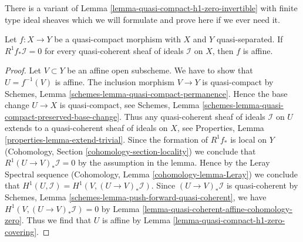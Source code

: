 \noindent
There is a variant of Lemma \ref{lemma-quasi-compact-h1-zero-invertible}
with finite type ideal sheaves which we will formulate and prove here if
we ever need it.

\begin{lemma}
\label{lemma-criterion-affine-morphism}
Let $f : X \to Y$ be a quasi-compact morphism with $X$ and $Y$ quasi-separated.
If $R^1f_*\mathcal{I} = 0$ for every quasi-coherent sheaf of ideals
$\mathcal{I}$ on $X$, then $f$ is affine.
\end{lemma}

\begin{proof}
Let $V \subset Y$ be an affine open subscheme. We have to show that
$U = f^{-1}(V)$ is affine. The inclusion morphism $V \to Y$ is quasi-compact
by Schemes, Lemma \ref{schemes-lemma-quasi-compact-permanence}.
Hence the base change $U \to X$ is quasi-compact, see
Schemes, Lemma \ref{schemes-lemma-quasi-compact-preserved-base-change}.
Thus any quasi-coherent sheaf of ideals $\mathcal{I}$ on $U$
extends to a quasi-coherent sheaf of ideals on $X$, see
Properties, Lemma \ref{properties-lemma-extend-trivial}.
Since the formation of $R^1f_*$ is local on $Y$
(Cohomology, Section \ref{cohomology-section-locality})
we conclude that $R^1(U \to V)_*\mathcal{I} = 0$ by the assumption
in the lemma. Hence by the Leray Spectral sequence
(Cohomology, Lemma \ref{cohomology-lemma-Leray})
we conclude that $H^1(U, \mathcal{I}) = H^1(V, (U \to V)_*\mathcal{I})$.
Since $(U \to V)_*\mathcal{I}$ is quasi-coherent by
Schemes, Lemma \ref{schemes-lemma-push-forward-quasi-coherent}, we have
$H^1(V, (U \to V)_*\mathcal{I}) = 0$ by
Lemma \ref{lemma-quasi-coherent-affine-cohomology-zero}.
Thus we find that $U$ is affine by
Lemma \ref{lemma-quasi-compact-h1-zero-covering}.
\end{proof}















